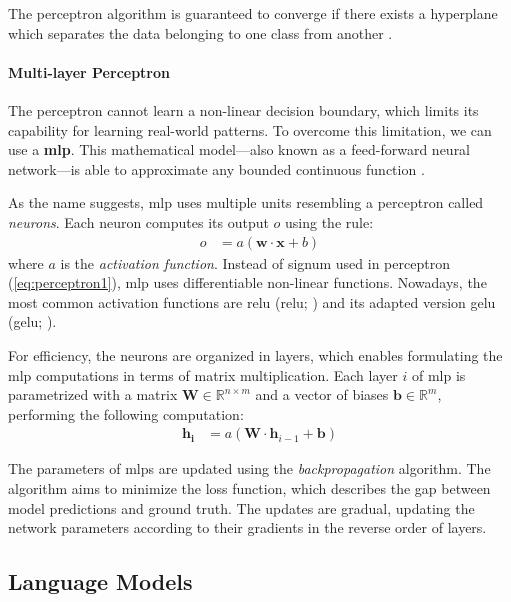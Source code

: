 The perceptron algorithm is guaranteed to converge if there exists a hyperplane which separates the data belonging to one class from another \cite{novikoff1962convergence}.

\paragraph{Multi-layer Perceptron} The perceptron cannot learn a non-linear decision boundary, which limits its capability for learning real-world patterns. To overcome this limitation, we can use a \textbf{\ac{mlp}}. This mathematical model---also known as a feed-forward neural network---is able to approximate any bounded continuous function \cite{hornik1989multilayer}.

As the name suggests, \ac{mlp} uses multiple units resembling a perceptron called \textit{neurons}. Each neuron computes its output $o$ using the rule:
\begin{align}
    o & = a(\mathbf{w} \cdot \mathbf{x} + b)
\end{align}
where $a$ is the \textit{activation function}. Instead of signum used in perceptron (\autoref{eq:perceptron1}), \ac{mlp} uses differentiable non-linear functions. Nowadays, the most common activation functions are \acl{relu} (\acs{relu}; \citealp{nair2010rectified}) and its adapted version \acl{gelu} (\acs{gelu}; \citealp{hendrycks2016gaussian}).

For efficiency, the neurons are organized in layers, which enables formulating the \ac{mlp} computations in terms of matrix multiplication. Each layer $i$ of \ac{mlp} is parametrized with a matrix $\mathbf{W} \in \mathbb{R}^{n\times m}$ and a vector of biases $\mathbf{b} \in \mathbb{R}^{m}$, performing the following computation:
\begin{align}
    \mathbf{h_i} & = a(\textbf{W} \cdot \mathbf{h}_{i-1} + \mathbf{b})
\end{align}

The parameters of \acp{mlp} are updated using the \textit{backpropagation} algorithm. The algorithm aims to minimize the loss function, which describes the gap between model predictions and ground truth. The updates are gradual, updating the network parameters according to their gradients in the reverse order of layers.


\subsection{Language Models}
\label{sec:lm-basics}



